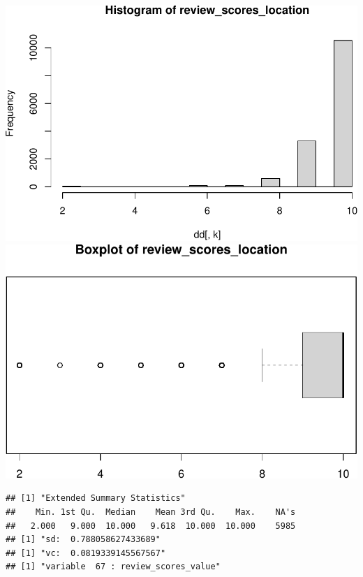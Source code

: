 \includegraphics{anal_files/figure-latex/unnamed-chunk-7-52.pdf}
\includegraphics{anal_files/figure-latex/unnamed-chunk-7-53.pdf}

\begin{verbatim}
## [1] "Extended Summary Statistics"
##    Min. 1st Qu.  Median    Mean 3rd Qu.    Max.    NA's 
##   2.000   9.000  10.000   9.618  10.000  10.000    5985 
## [1] "sd:  0.788058627433689"
## [1] "vc:  0.0819339145567567"
## [1] "variable  67 : review_scores_value"
\end{verbatim}


